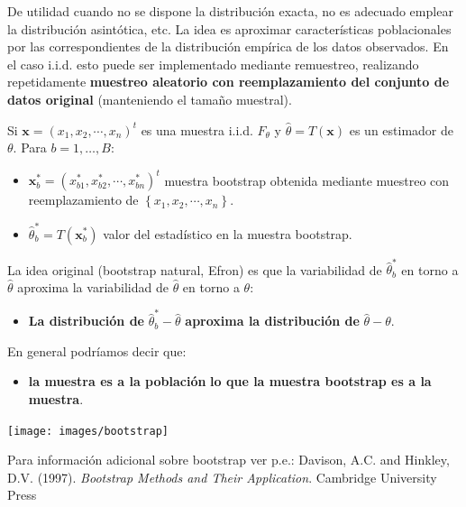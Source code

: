 \documentclass[
]{book}
\providecommand{\tightlist}{%
  \setlength{\itemsep}{0pt}\setlength{\parskip}{0pt}}
\theoremstyle{break}
\theoremstyle{definition}
\theoremstyle{definition}
\theoremstyle{definition}
\theoremstyle{remark}
\begin{document}
De utilidad cuando no se dispone la distribución exacta, no es
adecuado emplear la distribución asintótica, etc.
La idea es aproximar características poblacionales por las
correspondientes de la distribución empírica de los
datos observados.
En el caso i.i.d. esto puede ser implementado mediante remuestreo,
realizando repetidamente \textbf{muestreo aleatorio con reemplazamiento
del conjunto de datos original} (manteniendo el tamaño muestral).

Si \(\mathbf{x} = \left( x_{1},x_{2},\cdots ,x_{n}\right) ^{t}\) es una
muestra i.i.d. \(F_{\theta }\) y
\(\hat{\theta} = T\left( \mathbf{x} \right)\)
es un estimador de \(\theta\).
Para \(b = 1,\ldots ,B:\)

\begin{itemize}
\item
  \(\mathbf{x}_{b}^{\ast } = \left( x_{b1}^{\ast },x_{b2}^{\ast },\cdots ,x_{bn}^{\ast }\right) ^{t}\) muestra bootstrap obtenida mediante
  muestreo con reemplazamiento de
  \(\left\{ x_{1},x_{2},\cdots ,x_{n}\right\}\).
\item
  \(\hat{\theta}_{b}^{\ast } = T\left( \mathbf{x}_{b}^{\ast }\right)\)
  valor del estadístico en la muestra bootstrap.
\end{itemize}

La idea original (bootstrap natural, Efron) es que la variabilidad
de \(\hat{\theta}_{b}^{\ast }\) en torno a \(\hat{\theta}\) aproxima la
variabilidad de \(\hat{\theta}\) en torno a \(\theta\):

\begin{itemize}
\tightlist
\item
  \textbf{La distribución de} \(\hat{\theta}_{b}^{\ast }-\hat{\theta}\)
  \textbf{aproxima la distribución de} \(\hat{\theta}-\theta\).
\end{itemize}

En general podríamos decir que:

\begin{itemize}
\tightlist
\item
  \textbf{la muestra es a la población}
  \textbf{lo que la muestra bootstrap es a la muestra}.
\end{itemize}

\begin{center}\texttt{[image: images/bootstrap]} \end{center}

Para información adicional sobre bootstrap ver p.e.:
Davison, A.C. and Hinkley, D.V. (1997). \emph{Bootstrap Methods and Their Application}. Cambridge University Press
\end{document}

